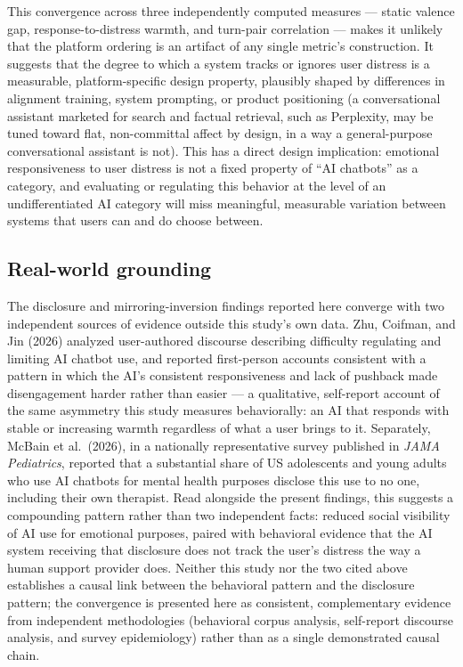 \documentclass[11pt]{article}
\begin{document}
This convergence across three independently computed measures --- static valence gap, response-to-distress warmth, and turn-pair correlation --- makes it unlikely that the platform ordering is an artifact of any single metric's construction. It suggests that the degree to which a system tracks or ignores user distress is a measurable, platform-specific design property, plausibly shaped by differences in alignment training, system prompting, or product positioning (a conversational assistant marketed for search and factual retrieval, such as Perplexity, may be tuned toward flat, non-committal affect by design, in a way a general-purpose conversational assistant is not). This has a direct design implication: emotional responsiveness to user distress is not a fixed property of ``AI chatbots'' as a category, and evaluating or regulating this behavior at the level of an undifferentiated AI category will miss meaningful, measurable variation between systems that users can and do choose between.

\subsection{Real-world grounding}

The disclosure and mirroring-inversion findings reported here converge with two independent sources of evidence outside this study's own data. Zhu, Coifman, and Jin (2026) analyzed user-authored discourse describing difficulty regulating and limiting AI chatbot use, and reported first-person accounts consistent with a pattern in which the AI's consistent responsiveness and lack of pushback made disengagement harder rather than easier --- a qualitative, self-report account of the same asymmetry this study measures behaviorally: an AI that responds with stable or increasing warmth regardless of what a user brings to it. Separately, McBain et al.\ (2026), in a nationally representative survey published in \emph{JAMA Pediatrics}, reported that a substantial share of US adolescents and young adults who use AI chatbots for mental health purposes disclose this use to no one, including their own therapist. Read alongside the present findings, this suggests a compounding pattern rather than two independent facts: reduced social visibility of AI use for emotional purposes, paired with behavioral evidence that the AI system receiving that disclosure does not track the user's distress the way a human support provider does. Neither this study nor the two cited above establishes a causal link between the behavioral pattern and the disclosure pattern; the convergence is presented here as consistent, complementary evidence from independent methodologies (behavioral corpus analysis, self-report discourse analysis, and survey epidemiology) rather than as a single demonstrated causal chain.
\end{document}
